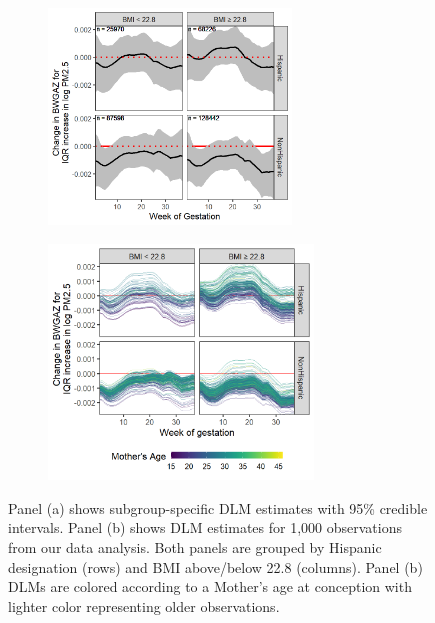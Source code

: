 \documentclass[12pt]{article}
\begin{document}
\begin{figure}[!ht]
    \centering
    \begin{subfigure}{0.49\textwidth}
        \includegraphics[height=5.75cm]{img/bwgaz_grp_hisp_bmi.png}
        \vspace{0.25cm}
        \caption{}
        \label{fig:grp_dlm_hisp_bmi}
    \end{subfigure}
    \begin{subfigure}{0.49\textwidth}
        \includegraphics[height=6.25cm]{img/bwgaz_hisp_bmi_age.png}
        \caption{}
        \label{fig:ind_dlm_hisp_bmi}
    \end{subfigure}
    \caption{Panel (a) shows subgroup-specific DLM estimates with 95\% credible intervals. Panel (b) shows DLM estimates for 1,000 observations from our data analysis.  Both panels are grouped by Hispanic designation (rows) and BMI above/below 22.8 (columns). Panel (b) DLMs are colored according to a Mother's age at conception with lighter color representing older observations.}
\end{figure}
\end{document}
